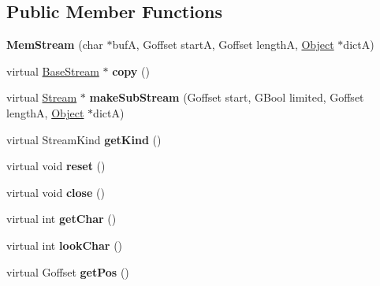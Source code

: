 \subsection*{Public Member Functions}
\begin{DoxyCompactItemize}
\item 
\mbox{\label{class_mem_stream_a0df2f1ad6f7697c37dbc7e1ea69f94a1}} 
{\bfseries Mem\+Stream} (char $\ast$bufA, Goffset startA, Goffset lengthA, \hyperlink{class_object}{Object} $\ast$dictA)
\item 
\mbox{\label{class_mem_stream_a554674a98452d1da5b6c7e6cc8d110a6}} 
virtual \hyperlink{class_base_stream}{Base\+Stream} $\ast$ {\bfseries copy} ()
\item 
\mbox{\label{class_mem_stream_a2768a8bff9d410e8f97e4ed2a99a4702}} 
virtual \hyperlink{class_stream}{Stream} $\ast$ {\bfseries make\+Sub\+Stream} (Goffset start, G\+Bool limited, Goffset lengthA, \hyperlink{class_object}{Object} $\ast$dictA)
\item 
\mbox{\label{class_mem_stream_ada0a48800b0a5e6820ffe33063d73b6e}} 
virtual Stream\+Kind {\bfseries get\+Kind} ()
\item 
\mbox{\label{class_mem_stream_a6ac7bc29df4f57382d8cec13efc30a56}} 
virtual void {\bfseries reset} ()
\item 
\mbox{\label{class_mem_stream_aac8646c4cb8feff60752bba1add73741}} 
virtual void {\bfseries close} ()
\item 
\mbox{\label{class_mem_stream_ad97f5776dba7499806f5c30250da2fec}} 
virtual int {\bfseries get\+Char} ()
\item 
\mbox{\label{class_mem_stream_a2ed84f9ec271d53220d5bdb58bdfe9de}} 
virtual int {\bfseries look\+Char} ()
\item 
\mbox{\label{class_mem_stream_afa72cb65d0dcf6abfd338ac5263df16a}} 
virtual Goffset {\bfseries get\+Pos} ()
\item 
\mbox{\label{class_mem_stream_ae9ed4d85362c2b835d25d549b68603b9}} 

\end{DoxyCompactItemize}
